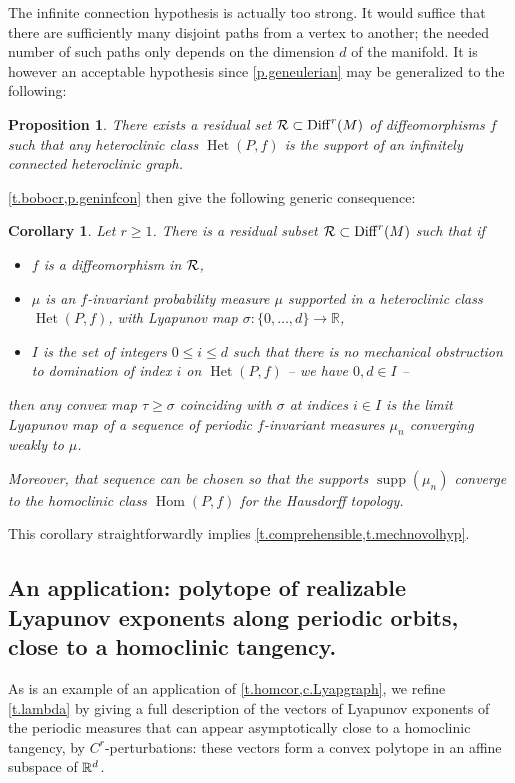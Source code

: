 \documentclass[11pt, a4paper]{amsart}
\theoremstyle{plain}
\newtheorem{proposition}{Proposition}[section]        %
\newtheorem{corollary}{Corollary}[theorem]
\theoremstyle{definition}
\theoremstyle{remark}
\numberwithin{equation}{section}         %
\DeclareMathOperator{\Diff}{{Diff}}
\DeclareMathOperator*{\supp}{supp}
\def\Diff{\operatorname{Diff}}
\def\Het{\operatorname{Het}}
\def\Hom{\operatorname{Hom}}
\begin{document}
The infinite connection hypothesis is actually too strong. It would suffice that there are sufficiently many disjoint paths from a vertex to another; the needed number of such paths  only depends on the dimension $d$ of the manifold.
It is however an acceptable hypothesis since \cref{p.geneulerian} may be generalized to the following:

\begin{proposition}\label{p.geninfcon}
There exists a residual set $\cR\subset \Diff^r(M)$ of diffeomorphisms $f$ such that any heteroclinic class $\Het(P,f)$ is the support of an infinitely connected heteroclinic graph.
\end{proposition}

\cref{t.bobocr,p.geninfcon} then give the following generic consequence:

\begin{corollary}\label{c.Lyapgraph}
Let $r\geq 1$. There is a residual subset $\cR \subset \Diff^r(M)$ such that if 
\begin{itemize}
\item $f$ is a diffeomorphism in ${\mathcal R}$,
\item $\mu$ is an $f$-invariant probability measure $\mu$ supported in a heteroclinic class $\Het(P,f)$, with Lyapunov map $\sigma\colon \{0,\ldots,d\}\to \mathbb{R}$,
\item $I$ is the set of integers $0\leq i\leq d$ such that there is no mechanical obstruction to domination of index $i$ on $\Het(P,f)$ -- we have $0,d\in I$ --
\end{itemize}
then any convex map $\tau\geq \sigma$ coinciding with $\sigma$ at indices $i\in I$ is the limit Lyapunov map of a sequence of periodic $f$-invariant measures $\mu_n$ converging weakly to $\mu$. 

Moreover, that sequence can be chosen so that the supports $\supp (\mu_n)$ converge to the homoclinic class $\Hom(P,f)$ for the Hausdorff topology.
\end{corollary}


This corollary straightforwardly implies \cref{t.comprehensible,t.mechnovolhyp}. 

\subsection{An application: polytope of realizable Lyapunov exponents along periodic orbits, close to a homoclinic tangency.}\label{s.polytope}

As is an example of an application of \cref{t.homcor,c.Lyapgraph}, we refine \cref{t.lambda} by giving a full description of the vectors of Lyapunov exponents of the periodic measures that can appear asymptotically close to a homoclinic tangency,  by $C^r$-perturbations:
these vectors form a convex polytope in an affine subspace of ${\mathbb R}^d$. 
\end{document}
